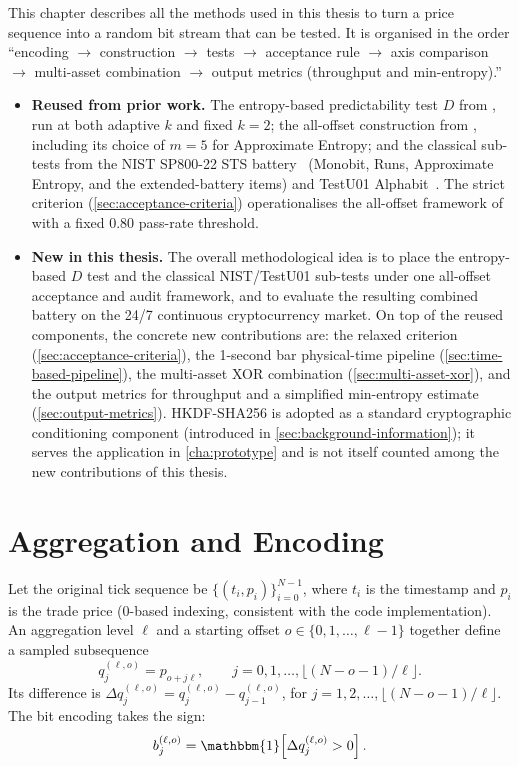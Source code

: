 \documentclass[11pt,titlepage,openany,oneside]{book}  %
\begin{document}
This chapter describes all the methods used in this thesis to turn a price sequence into a random bit stream that can be tested. It is organised in the order ``encoding $\to$ construction $\to$ tests $\to$ acceptance rule $\to$ axis comparison $\to$ multi-asset combination $\to$ output metrics (throughput and min-entropy).''
\begin{itemize}
\item \textbf{Reused from prior work.} The entropy-based predictability test $D$ from \citet{shternshis2025predictability}, run at both adaptive $k$ and fixed $k = 2$; the all-offset construction from \citet{onofri2025emergence}, including its choice of $m = 5$ for Approximate Entropy; and the classical sub-tests from the NIST SP800-22 STS battery~\citep{bassham2010sp80022} (Monobit, Runs, Approximate Entropy, and the extended-battery items) and TestU01 Alphabit~\citep{lecuyer2007testu01}. The strict criterion (\cref{sec:acceptance-criteria}) operationalises the all-offset framework of \citet{onofri2025emergence} with a fixed 0.80 pass-rate threshold.
\item \textbf{New in this thesis.} The overall methodological idea is to place the entropy-based $D$ test and the classical NIST/TestU01 sub-tests under one all-offset acceptance and audit framework, and to evaluate the resulting combined battery on the 24/7 continuous cryptocurrency market. On top of the reused components, the concrete new contributions are: the relaxed criterion (\cref{sec:acceptance-criteria}), the 1-second bar physical-time pipeline (\cref{sec:time-based-pipeline}), the multi-asset XOR combination (\cref{sec:multi-asset-xor}), and the output metrics for throughput and a simplified min-entropy estimate (\cref{sec:output-metrics}). HKDF-SHA256 is adopted as a standard cryptographic conditioning component (introduced in \cref{sec:background-information}); it serves the application in \cref{cha:prototype} and is not itself counted among the new contributions of this thesis.
\end{itemize}

\section{Aggregation and Encoding}
\label{sec:aggregation-encoding}

Let the original tick sequence be $\{(t_i, p_i)\}_{i=0}^{N-1}$, where $t_i$ is the timestamp and $p_i$ is the trade price (0-based indexing, consistent with the code implementation). An aggregation level $\ell$ and a starting offset $o \in \{0, 1, \ldots, \ell - 1\}$ together define a sampled subsequence
\begin{equation}
q^{(\ell, o)}_j = p_{o + j\ell}, \qquad j = 0, 1, \ldots, \lfloor (N - o - 1) / \ell \rfloor.
\end{equation}
Its difference is $\Delta q^{(\ell, o)}_j = q^{(\ell, o)}_j - q^{(\ell, o)}_{j-1}$, for $j = 1, 2, \ldots, \lfloor (N - o - 1) / \ell \rfloor$. The bit encoding takes the sign:
\begin{equation}
b^{(\ell, o)}_j = \mathbbm{1}\!\left[\Delta q^{(\ell, o)}_j > 0\right].
\end{equation}
\end{document}
